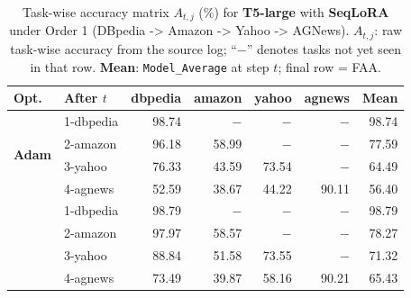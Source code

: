 
\begin{table}[ht]
\centering
\caption{%
  Task-wise accuracy matrix $A_{t,j}$ (\%) for \textbf{T5-large} with \textbf{SeqLoRA} under Order 1 (DBpedia -> Amazon -> Yahoo -> AGNews).
  $A_{t,j}$: raw task-wise accuracy from the source log; ``$-$'' denotes tasks not yet seen in that row.
  \textbf{Mean}: \texttt{Model\_Average} at step $t$; final row = FAA.
}
\label{tab:nlp_o1_t5large_seqlora}
\setlength{\tabcolsep}{4.0pt}
\renewcommand{\arraystretch}{0.92}
\scriptsize
\begin{tabular}{@{}l l r r r r r@{}}
\toprule
\textbf{Opt.} & \textbf{After $t$} & \textbf{dbpedia} & \textbf{amazon} & \textbf{yahoo} & \textbf{agnews} & \textbf{Mean} \\
\midrule
\multirow{4}{*}{\textbf{Adam}} & 1-dbpedia & 98.74 & $-$ & $-$ & $-$ & 98.74 \\
 & 2-amazon & 96.18 & 58.99 & $-$ & $-$ & 77.59 \\
 & 3-yahoo & 76.33 & 43.59 & 73.54 & $-$ & 64.49 \\
 & 4-agnews & 52.59 & 38.67 & 44.22 & 90.11 & 56.40 \\
\addlinespace[2pt]
\multirow{4}{*}{\textbf{SAM}} & 1-dbpedia & 98.79 & $-$ & $-$ & $-$ & 98.79 \\
 & 2-amazon & 97.97 & 58.57 & $-$ & $-$ & 78.27 \\
 & 3-yahoo & 88.84 & 51.58 & 73.55 & $-$ & 71.32 \\
 & 4-agnews & 73.49 & 39.87 & 58.16 & 90.21 & 65.43 \\
\bottomrule
\end{tabular}
\end{table}

